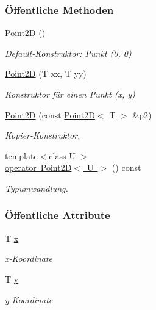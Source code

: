 \subsubsection*{Öffentliche Methoden}
\begin{DoxyCompactItemize}
\item 
\mbox{\hyperlink{classPoint2D_aee9a754c77f7d10e637348db18dc537c}{Point2D}} ()
\begin{DoxyCompactList}\small\item\em Default-\/\+Konstruktor\+: Punkt (0, 0) \end{DoxyCompactList}\item 
\mbox{\hyperlink{classPoint2D_aa0bdade25949f97757b579587443da87}{Point2D}} (T xx, T yy)
\begin{DoxyCompactList}\small\item\em Konstruktor für einen Punkt ({\ttfamily x}, {\ttfamily y}) \end{DoxyCompactList}\item 
\mbox{\hyperlink{classPoint2D_ac69d6810a532c31075a3c3924c9f8610}{Point2D}} (const \mbox{\hyperlink{classPoint2D}{Point2D}}$<$ T $>$ \&p2)
\begin{DoxyCompactList}\small\item\em Kopier-\/\+Konstruktor. \end{DoxyCompactList}\item 
{\footnotesize template$<$class U $>$ }\\\mbox{\hyperlink{classPoint2D_a6cb0bced30a7c900a39188c5d1c540de}{operator Point2\+D$<$ U $>$}} () const
\begin{DoxyCompactList}\small\item\em Typumwandlung. \end{DoxyCompactList}\end{DoxyCompactItemize}
\subsubsection*{Öffentliche Attribute}
\begin{DoxyCompactItemize}
\item 
T \mbox{\hyperlink{classPoint2D_af645991722e4a2285f9aaaaf2e3435cd}{x}}
\begin{DoxyCompactList}\small\item\em x-\/\+Koordinate \end{DoxyCompactList}\item 
T \mbox{\hyperlink{classPoint2D_ac9477b55718b628606930d8d4971e835}{y}}
\begin{DoxyCompactList}\small\item\em y-\/\+Koordinate \end{DoxyCompactList}\end{DoxyCompactItemize}


